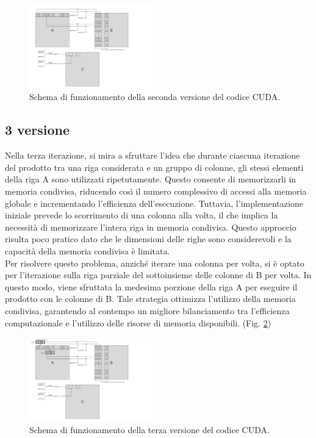 \documentclass[conference]{IEEEtran}
\begin{document}
\begin{figure}[H]
    \centering
    \includegraphics[width=0.5\textwidth]{resources/cuda_scheme_v2.png}
    \caption{Schema di funzionamento della seconda versione del codice CUDA.}
    \label{fig:cuda_scheme_v2}
\end{figure}

\subsection{3 versione}
Nella terza iterazione, si mira a sfruttare l'idea che durante ciascuna iterazione del prodotto tra una riga considerata e un gruppo di colonne, gli stessi elementi della riga A sono utilizzati ripetutamente. Questo consente di memorizzarli in memoria condivisa, riducendo così il numero complessivo di accessi alla memoria globale e incrementando l'efficienza dell'esecuzione. Tuttavia, l'implementazione iniziale prevede lo scorrimento di una colonna alla volta, il che implica la necessità di memorizzare l'intera riga in memoria condivisa. Questo approccio risulta poco pratico dato che le dimensioni delle righe sono considerevoli e la capacità della memoria condivisa è limitata. \\ Per risolvere questo problema, anziché iterare una colonna per volta, si è optato per l'iterazione sulla riga parziale del sottoinsieme delle colonne di B per volta. In questo modo, viene sfruttata la medesima porzione della riga A per eseguire il prodotto con le colonne di B. Tale strategia ottimizza l'utilizzo della memoria condivisa, garantendo al contempo un migliore bilanciamento tra l'efficienza computazionale e l'utilizzo delle risorse di memoria disponibili. (Fig. \ref{fig:cuda_scheme_v3})

\begin{figure}[H]
    \centering
    \includegraphics[width=0.5\textwidth]{resources/cuda_scheme_v3.png}
    \caption{Schema di funzionamento della terza versione del codice CUDA.}
    \label{fig:cuda_scheme_v3}
\end{figure}
\end{document}
